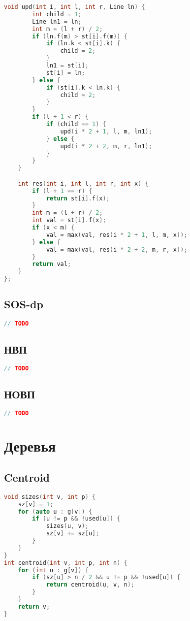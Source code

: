 \documentclass[10pt,a4paper,landscape,twosided]{extarticle}
\begin{document}
\begin{multicols}{3}
\begin{lstlisting}[language=C++]
    void upd(int i, int l, int r, Line ln) {
        int child = 1;
        Line ln1 = ln;
        int m = (l + r) / 2;
        if (ln.f(m) > st[i].f(m)) {
            if (ln.k < st[i].k) {
                child = 2;
            }
            ln1 = st[i];
            st[i] = ln;
        } else {
            if (st[i].k < ln.k) {
                child = 2;
            }
        }
        if (l + 1 < r) {
            if (child == 1) {
                upd(i * 2 + 1, l, m, ln1);
            } else {
                upd(i * 2 + 2, m, r, ln1);
            }
        }
    }

    int res(int i, int l, int r, int x) {
        if (l + 1 == r) {
            return st[i].f(x);
        }
        int m = (l + r) / 2;
        int val = st[i].f(x);
        if (x < m) {
            val = max(val, res(i * 2 + 1, l, m, x));
        } else {
            val = max(val, res(i * 2 + 2, m, r, x));
        }
        return val;
    }
};

\end{lstlisting}

\subsection{SOS-dp}
\begin{lstlisting}[language=C++]
// TODO

\end{lstlisting}

\subsection{НВП}
\begin{lstlisting}[language=C++]
// TODO

\end{lstlisting}

\subsection{НОВП}
\begin{lstlisting}[language=C++]
// TODO

\end{lstlisting}

\section{Деревья}

\subsection{Centroid}
\begin{lstlisting}[language=C++]
void sizes(int v, int p) {
    sz[v] = 1;
    for (auto u : g[v]) {
        if (u != p && !used[u]) {
            sizes(u, v);
            sz[v] += sz[u];
        }
    }
}
int centroid(int v, int p, int n) {
    for (int u : g[v]) {
        if (sz[u] > n / 2 && u != p && !used[u]) {
            return centroid(u, v, n);
        }
    }
    return v;
}


\end{lstlisting}
\end{multicols}
\end{document}
